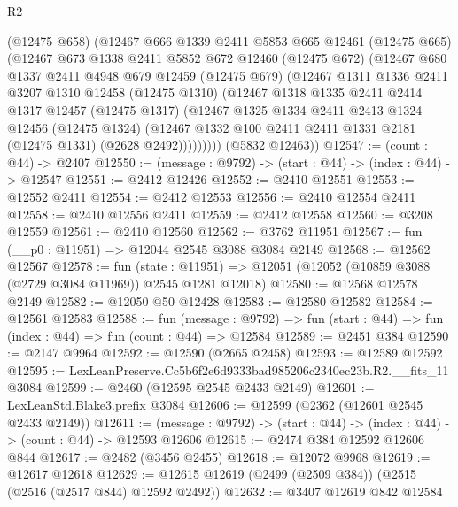 \begin{lexlean}{R2}
\begin{coremodule}
        (@12475 @658)
        (@12467
          @666
          @1339
          @2411
          @5853
          @665
          @12461
          (@12475 @665)
          (@12467
            @673
            @1338
            @2411
            @5852
            @672
            @12460
            (@12475 @672)
            (@12467
              @680
              @1337
              @2411
              @4948
              @679
              @12459
              (@12475 @679)
              (@12467
                @1311
                @1336
                @2411
                @3207
                @1310
                @12458
                (@12475 @1310)
                (@12467
                  @1318
                  @1335
                  @2411
                  @2414
                  @1317
                  @12457
                  (@12475 @1317)
                  (@12467
                    @1325
                    @1334
                    @2411
                    @2413
                    @1324
                    @12456
                    (@12475 @1324)
                    (@12467 @1332 @100 @2411 @2411 @1331 @2181 (@12475 @1331) (@2628 @2492)))))))))
      (@5832 @12463))
@12547 := (count : @44) -> @2407
@12550 := (message : @9792) -> (start : @44) -> (index : @44) -> @12547
@12551 := @2412 @12426
@12552 := @2410 @12551
@12553 := @12552 @2411
@12554 := @2412 @12553
@12556 := @2410 @12554 @2411
@12558 := @2410 @12556 @2411
@12559 := @2412 @12558
@12560 := @3208 @12559
@12561 := @2410 @12560
@12562 := @3762 @11951
@12567 := fun (__p0 : @11951) => @12044 @2545 @3088 @3084 @2149
@12568 := @12562 @12567
@12578 := fun (state : @11951) =>
  @12051 (@12052 (@10859 @3088 (@2729 @3084 @11969)) @2545 @1281 @12018)
@12580 := @12568 @12578 @2149
@12582 := @12050 @50 @12428
@12583 := @12580 @12582
@12584 := @12561 @12583
@12588 := fun (message : @9792) =>
  fun (start : @44) => fun (index : @44) => fun (count : @44) => @12584
@12589 := @2451 @384
@12590 := @2147 @9964
@12592 := @12590 (@2665 @2458)
@12593 := @12589 @12592
@12595 := LexLeanPreserve.Cc5b6f2e6d9333bad985206c2340ec23b.R2.__fits_11 @3084
@12599 := @2460 (@12595 @2545 @2433 @2149)
@12601 := LexLeanStd.Blake3.prefix @3084
@12606 := @12599 (@2362 (@12601 @2545 @2433 @2149))
@12611 := (message : @9792) -> (start : @44) -> (index : @44) -> (count : @44) -> @12593 @12606
@12615 := @2474 @384 @12592 @12606 @844
@12617 := @2482 (@3456 @2455)
@12618 := @12072 @9968
@12619 := @12617 @12618
@12629 := @12615 @12619 (@2499 (@2509 @384)) (@2515 (@2516 (@2517 @844) @12592 @2492))
@12632 := @3407 @12619 @842 @12584

\end{coremodule}
\end{lexlean}
